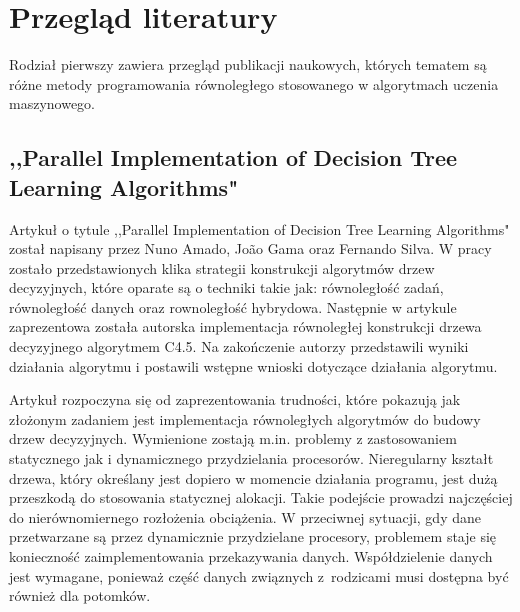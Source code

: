 \documentclass[12pt]{article}
\begin{document}
\section{Przegląd literatury}

Rodział pierwszy zawiera przegląd publikacji naukowych, których tematem są różne metody programowania równoległego stosowanego
w algorytmach uczenia maszynowego.

\subsection{,,Parallel Implementation of Decision Tree Learning Algorithms"}

Artykuł o tytule ,,Parallel Implementation of Decision Tree Learning Algorithms" został napisany przez Nuno Amado, Jo\~{a}o Gama oraz Fernando Silva.
W pracy zostało przedstawionych klika strategii
konstrukcji algorytmów drzew decyzyjnych, które oparate są o techniki takie jak: równoległość zadań, równoległość danych oraz rownoległość
hybrydowa. Następnie w artykule zaprezentowa została autorska implementacja równoległej konstrukcji drzewa decyzyjnego algorytmem
C4.5. Na zakończenie autorzy przedstawili wyniki działania algorytmu i postawili wstępne wnioski dotyczące działania algorytmu.

Artykuł rozpoczyna się od zaprezentowania trudności, które pokazują jak złożonym zadaniem jest implementacja równoległych
algorytmów do budowy drzew decyzyjnych. Wymienione zostają m.in. problemy z zastosowaniem statycznego jak i dynamicznego przydzielania procesorów.
Nieregularny kształt drzewa, który określany jest dopiero w momencie działania programu, jest dużą przeszkodą do stosowania statycznej alokacji. Takie podejście prowadzi
najczęściej do nierównomiernego rozłożenia obciążenia. W przeciwnej sytuacji, gdy dane przetwarzane są przez dynamicznie przydzielane procesory, problemem staje się
konieczność zaimplementowania przekazywania danych. Współdzielenie danych jest wymagane, ponieważ część danych związnych z~rodzicami musi dostępna być również dla potomków.
\end{document}
